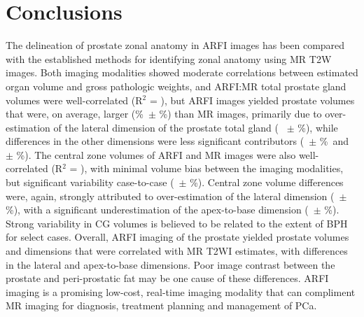 \section{Conclusions}
The delineation of prostate zonal anatomy in ARFI images has been compared with
the established methods for identifying zonal anatomy using MR T2W images.
Both imaging modalities showed moderate correlations between estimated organ
volume and gross pathologic weights, and ARFI:MR total prostate gland volumes
were well-correlated (R$^2$ = \MRarfiVolTotalRsq), but ARFI images yielded
prostate volumes that were, on average, larger (\MRarfiVolTotalMeanDiff\%~$\pm$
\MRarfiVolTotalStdDiff\%) than MR images, primarily due to over-estimation of
the lateral dimension of the prostate total gland (\ARFImrTotalLatLatMeanPct~
$\pm$ \ARFImrTotalLatLatStdPct\%), while differences in the other dimensions
were less significant contributors (\ARFImrTotalAntPostMeanPct~$\pm$
\ARFImrTotalAntPostStdPct\%~and \ARFImrTotalApexBaseMeanPct~$\pm$
\ARFImrTotalApexBaseStdPct\%).  The central zone volumes of ARFI and MR images
were also well-correlated (R$^2$ = \MRarfiVolCentralRsq), with minimal volume
bias between the imaging modalities, but significant variability case-to-case
(\MRarfiVolCentralMeanDiff~$\pm$ \MRarfiVolCentralStdDiff\%).  Central zone
volume differences were, again, strongly attributed to over-estimation of the
lateral dimension (\ARFImrCentralLatLatMeanPct~$\pm$
\ARFImrCentralLatLatStdPct\%), with a significant underestimation of the
apex-to-base dimension (\ARFImrCentralAntPostMeanPct~$\pm$
\ARFImrCentralAntPostStdPct\%).  Strong variability in CG volumes is believed
to be related to the extent of BPH for select cases.  Overall, ARFI imaging of
the prostate yielded prostate volumes and dimensions that were correlated with
MR T2WI estimates, with differences in the lateral and apex-to-base dimensions.
Poor image contrast between the prostate and peri-prostatic fat may be one
cause of these differences.  ARFI imaging is a promising low-cost, real-time
imaging modality that can compliment MR imaging for diagnosis, treatment
planning and management of PCa.
